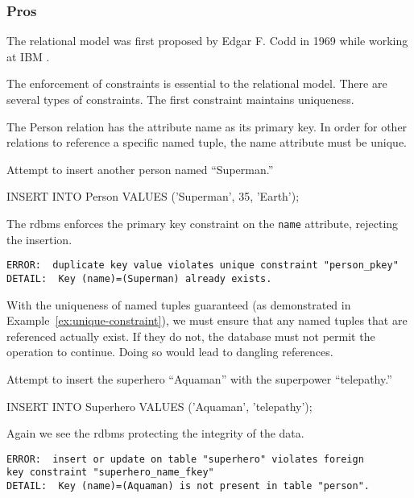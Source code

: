 		\subsubsection{Pros}
			The relational model was first proposed by Edgar F. Codd in 1969 while working at IBM \cite{codd-69}.
			
			The enforcement of constraints is essential to the relational model.  There are several types of constraints.  The first constraint maintains uniqueness.
			
			The Person relation has the attribute name as its primary key.  In order for other relations to reference a specific named tuple, the name attribute must be unique.
			
			\begin{ex}
			\label{ex:unique-constraint}
				Attempt to insert another person named ``Superman.''
				
				\begin{singlespaced}
					\begin{sqlcode}
INSERT INTO Person
VALUES      ('Superman',
             35,
             'Earth'); 
					\end{sqlcode}
				\end{singlespaced}
				
				The \gls{rdbms} enforces the primary key constraint on the \texttt{name} attribute, rejecting the insertion.
				
				\begin{verbatim}
ERROR:  duplicate key value violates unique constraint "person_pkey"
DETAIL:  Key (name)=(Superman) already exists.
				\end{verbatim}
			\end{ex}
			
			With the uniqueness of named tuples guaranteed (as demonstrated in Example~\ref{ex:unique-constraint}), we must ensure that any named tuples that are referenced actually exist.  If they do not, the database must not permit the operation to continue.  Doing so would lead to dangling references.
			
			\begin{ex}
				Attempt to insert the superhero ``Aquaman'' with the superpower ``telepathy.''
				
				\begin{singlespaced}
					\begin{sqlcode}
INSERT INTO Superhero
VALUES      ('Aquaman',
             'telepathy'); 
					\end{sqlcode}
				\end{singlespaced}
				
				Again we see the \gls{rdbms} protecting the integrity of the data.
				
				\begin{verbatim}
ERROR:  insert or update on table "superhero" violates foreign
key constraint "superhero_name_fkey"
DETAIL:  Key (name)=(Aquaman) is not present in table "person".
				\end{verbatim}
			\end{ex}
			

